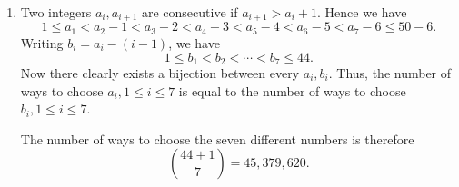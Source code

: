 \documentclass[a4paper,11pt]{article}
\begin{document}
\begin{enumerate}
		\item Two integers $a_i, a_{i+1}$ are consecutive if $a_{i+1} > a_i + 1$. Hence we have
		\begin{equation*}
			1 \le a_1 < a_2 - 1 < a_3 - 2 < a_4 - 3 < a_5 - 4 < a_6 - 5 < a_7 - 6 \le 50 - 6.
		\end{equation*}
		Writing $b_i = a_i - (i-1)$, we have
		\begin{equation*}
			1 \le b_1 < b_2 < \cdots < b_7 \le 44.
		\end{equation*}
		Now there clearly exists a bijection between every $a_i, b_i$. Thus, the number of ways to choose $a_i, 1 \le i \le 7$ is equal to the number of ways to choose $b_i, 1 \le i \le 7$.
		
		The number of ways to choose the seven different numbers is therefore
		\begin{equation*}
			\binom{44+1}{7} = 45,379,620.
		\end{equation*}
		

\end{enumerate}
\end{document}
